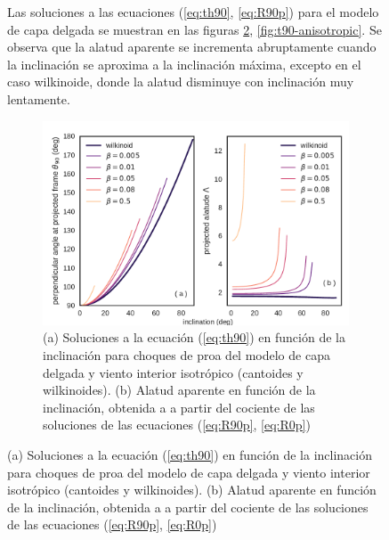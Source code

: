 \begin{figure}
Las soluciones a las ecuaciones (\ref{eq:th90}, \ref{eq:R90p}) para el modelo de capa delgada se muestran en las figuras \ref{fig:t90-isotropic}, \ref{fig:t90-anisotropic}. Se observa que la alatud aparente se incrementa abruptamente cuando la inclinación se aproxima a la inclinación máxima, excepto en el caso wilkinoide, donde la alatud disminuye con inclinación muy lentamente.

\begin{figure}
  \centering
  \includegraphics[width=\linewidth]{./Figures/cantoid-th90-vs-i}
  \caption{(a) Soluciones a la ecuación (\ref{eq:th90}) en función de la inclinación para choques de proa del modelo de capa delgada y viento interior isotrópico (cantoides y wilkinoides). (b) Alatud aparente en función de la inclinación, obtenida a a partir del cociente de las soluciones de las ecuaciones (\ref{eq:R90p}, \ref{eq:R0p})}
  \label{fig:t90-isotropic}
\end{figure}


\end{figure}

